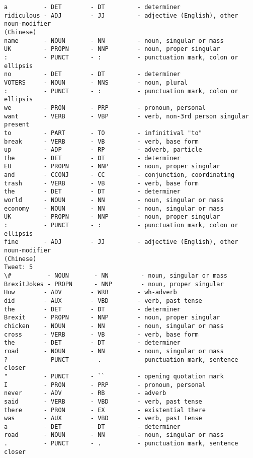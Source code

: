 \documentclass[11pt]{article}
\begin{document}
\begin{Verbatim}[commandchars=\\\{\}]
a          - DET        - DT         - determiner
ridiculous - ADJ        - JJ         - adjective (English), other noun-modifier
(Chinese)
name       - NOUN       - NN         - noun, singular or mass
UK         - PROPN      - NNP        - noun, proper singular
:          - PUNCT      - :          - punctuation mark, colon or ellipsis
no         - DET        - DT         - determiner
VOTERS     - NOUN       - NNS        - noun, plural
:          - PUNCT      - :          - punctuation mark, colon or ellipsis
we         - PRON       - PRP        - pronoun, personal
want       - VERB       - VBP        - verb, non-3rd person singular present
to         - PART       - TO         - infinitival "to"
break      - VERB       - VB         - verb, base form
up         - ADP        - RP         - adverb, particle
the        - DET        - DT         - determiner
EU         - PROPN      - NNP        - noun, proper singular
and        - CCONJ      - CC         - conjunction, coordinating
trash      - VERB       - VB         - verb, base form
the        - DET        - DT         - determiner
world      - NOUN       - NN         - noun, singular or mass
economy    - NOUN       - NN         - noun, singular or mass
UK         - PROPN      - NNP        - noun, proper singular
:          - PUNCT      - :          - punctuation mark, colon or ellipsis
fine       - ADJ        - JJ         - adjective (English), other noun-modifier
(Chinese)
Tweet: 5
\#          - NOUN       - NN         - noun, singular or mass
BrexitJokes - PROPN      - NNP        - noun, proper singular
How        - ADV        - WRB        - wh-adverb
did        - AUX        - VBD        - verb, past tense
the        - DET        - DT         - determiner
Brexit     - PROPN      - NNP        - noun, proper singular
chicken    - NOUN       - NN         - noun, singular or mass
cross      - VERB       - VB         - verb, base form
the        - DET        - DT         - determiner
road       - NOUN       - NN         - noun, singular or mass
?          - PUNCT      - .          - punctuation mark, sentence closer
"          - PUNCT      - ``         - opening quotation mark
I          - PRON       - PRP        - pronoun, personal
never      - ADV        - RB         - adverb
said       - VERB       - VBD        - verb, past tense
there      - PRON       - EX         - existential there
was        - AUX        - VBD        - verb, past tense
a          - DET        - DT         - determiner
road       - NOUN       - NN         - noun, singular or mass
.          - PUNCT      - .          - punctuation mark, sentence closer

\end{Verbatim}
\end{document}
